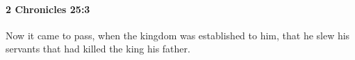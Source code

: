 
		\paragraph{2 Chronicles 25:3} %
			\label{2CHRONICLES-25-3}

			Now it came to pass, when the kingdom was established to him, that he slew his servants that had killed the king his father.


